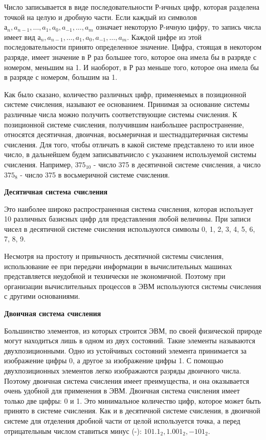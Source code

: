 \documentclass[a4paper]{article}
\begin{document}
Число записывается в виде последовательности Р-ичных цифр, которая разделена точкой на целую и дробную части. Если каждый из символов $а_{n}, a_{n-1},\dots,a_{1}, a_{0}, a_{-1}, \dots,a_{m}$ означает некоторую Р-ичную цифру, то запись числа имеет вид $а_{n}, a_{n-1},\dots,a_{1}, a_{0},a_{-1}, \dots,a_{m}$. Каждой цифре из этой последовательности принято определенное значение. Цифра, стоящая в некотором разряде, имеет значение в Р раз большее того, которое она имела бы в разряде с номером, меньшим на
1. И наоборот, в Р раз меньше того, которое она имела бы в разряде с номером, большим на 1.

Как было сказано, количество различных цифр, применяемых в позиционной системе счисления, называют ее основанием. Принимая за основание системы различные числа можно получить соответствующие системы счисления. К позиционной системе счисления, получившим наибольшее распространение, относятся десятичная, двоичная, восьмеричная и шестнадцатеричная системы счисления. Для того, чтобы отличать в какой системе представлено то или иное число, в дальнейшем будем записыватьчисло с указанием используемой системы счисления. Например, $375_{10}$ - число 375 в десятичной системе счисления, а число $375_{8}$ - число 375 в восьмеричной системе счисления.

\textbf{Десятичная система счисления}

Это наиболее широко распространенная система счисления, которая использует 10 различных базисных цифр для представления любой величины. При записи чисел в десятичной системе счисления используются символы 0, 1, 2, 3, 4, 5, 6, 7, 8, 9.

Несмотря на простоту и привычность десятичной системы счисления, использование ее при передачи информации в вычислительных машинах представляется неудобной и технически не экономичной. Поэтому при организации вычислительных процессов в ЭВМ используются системы счисления с другими основаниями.

\textbf{Двоичная система счисления}

Большинство элементов, из которых строится ЭВМ, по своей физической природе могут находиться лишь в одном из двух состояний. Такие элементы называются двухпозиционными. Одно из устойчивых состояний элемента принимается за изображение цифры 0, а другое за изображение цифры 1. С помощью двухпозиционных элементов легко изображаются разряды двоичного числа. Поэтому двоичная система счисления имеет преимущества, и она оказывается очень удобной для применения в ЭВМ. Двоичная система счисления имеет только две цифры: 0 и 1. Это минимальное количество цифр, которое может быть принято в системе счисления. Как и в десятичной системе счисления, в двоичной системе для отделения дробной части от целой используется точка, а перед отрицательным числом ставиться минус (-): $101.1_{2}, 1.001_{2}, -101_{2}$.
\end{document}
